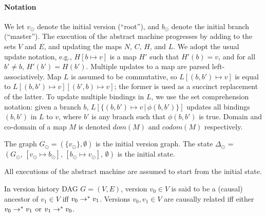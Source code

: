 \paragraph{Notation} We let $v_{\odot}$ denote the initial version
(``root''), and $b_{\odot}$ denote the initial branch (``master'').
The execution of the abstract machine progresses by adding to the sets
$V$ and $E$, and updating the maps $N$, $C$, $H$, and $L$. We adopt
the usual update notation, e.g., $H[b \mapsto v]$ is a map $H'$ such
that $H'(b) = v$, and for all $b' \neq b$, $H'(b') = H(b')$.  Multiple
updates to a map are parsed left-associatively. Map $L$ is assumed to
be commutative, so $L[(b,b') \mapsto v]$ is equal to $L[(b,b') \mapsto
v][(b',b) \mapsto v]$; the former is used as a succinct replacement of
the latter. To update multiple bindings in $L$, we use the set
comprehension notation: given a branch $b$, $L[\{(b,b') \mapsto v
\,|\, \phi(b,b')\}]$ updates all bindings $(b,b')$ in $L$ to $v$,
where $b'$ is any branch such that $\phi(b,b')$ is true. Domain and
co-domain of a map $M$ is denoted $dom(M)$ and $codom(M)$
respectively.

\begin{definition}
\label{def:init-state}
  The graph $G_{\odot} = (\{v_{\odot}\},\emptyset)$ is the initial
  version graph. The state $\Delta_{\odot}$ = $(G_{\odot},\,
  [v_{\odot} \mapsto b_{\odot}],\, [b_{\odot} \mapsto v_{\odot}],\,
  \emptyset)$ is the initial state.
\end{definition}

\noindent All executions of the abstract machine are assumed to start from the
initial state.

\begin{definition}[Ancestor]
  \label{def:ancestor}
  In version history DAG $G = (V,E)$, version $v_0 \in V$ is said
  to be a (causal) ancestor of $v_1 \in V$ iff $v_0 \rightarrow^{*} v_1$.
  Versions $v_0, v_1 \in V$ are causally related iff either $v_0
  \rightarrow^{*} v_1$ or $v_1 \rightarrow^{*} v_0$.
\end{definition}


